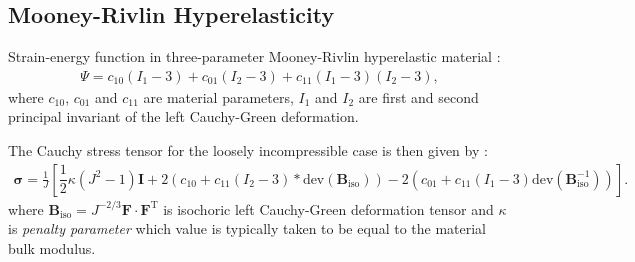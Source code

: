 \documentclass[sn-mathphys,Numbered]{sn-jnl}%
\newcommand{\bb}{\boldsymbol}
\begin{document}
\begin{appendices}
\subsection{Mooney-Rivlin Hyperelasticity} 
\label{app:mechLaws:MR}
%
Strain-energy function in three-parameter Mooney-Rivlin hyperelastic material \cite{Rivlin1951}:
%
\begin{eqnarray}
\Psi = c_{10}(I_1-3) + c_{01}(I_2-3) + c_{11}(I_1-3)(I_2-3),
\end{eqnarray}
%
where $c_{10}$, $c_{01}$ and $c_{11}$ are material parameters, $I_1$ and $I_2$ are first and second principal invariant of the left Cauchy-Green deformation.

The Cauchy stress tensor for the loosely incompressible case is then given by \cite{oliveira2020}:
\begin{eqnarray}
\bb{\sigma} = \frac{1}{J} \left[ \dfrac{1}{2}\kappa(J^2-1)\bb{I} + 2(c_{10}+c_{11}(I_2-3)*\text{dev}(\bb{B}_{\mathrm{iso}})) -2(c_{01}+c_{11}(I_1-3)\text{dev}(\bb{B}_{\mathrm{iso}}^{-1}))\right].
\end{eqnarray}
where $\bb{B}_{\mathrm{iso}}=J^{-2/3}\bb{F}\cdot\bb{F}^{\mathrm{T}}$ is isochoric left Cauchy-Green deformation tensor and $\kappa$ is \emph{penalty parameter} which value is typically taken to be equal to the material bulk modulus.
%
%

\end{appendices}
\end{document}
